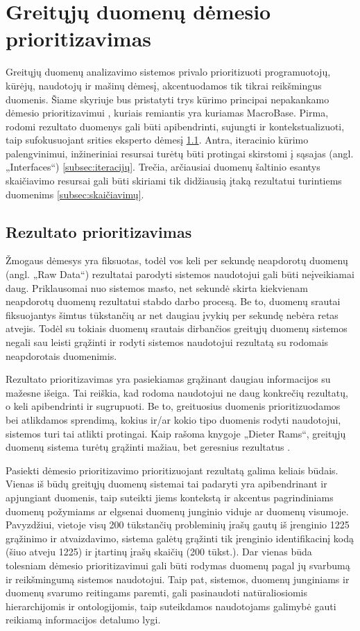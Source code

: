 \documentclass{VUMIFPSkursinis}
\begin{document}
\section{Greitųjų duomenų dėmesio prioritizavimas}
Greitųjų duomenų analizavimo sistemos privalo prioritizuoti programuotojų, kūrėjų, naudotojų ir mašinų dėmesį, akcentuodamos tik tikrai reikšmingus duomenis. Šiame skyriuje bus pristatyti trys kūrimo principai nepakankamo dėmesio prioritizavimui \cite{prioritizing_attention}, kuriais remiantis yra kuriamas MacroBase. Pirma, rodomi rezultato duomenys gali būti apibendrinti, sujungti ir kontekstualizuoti, taip sufokusuojant srities eksperto dėmesį \ref{subsec:rezultato}. Antra, iteracinio kūrimo palengvinimui, inžineriniai resursai turėtų būti protingai skirstomi į sąsajas (angl. „Interfaces“) \ref{subsec:iteracijų}. Trečia, arčiausiai duomenų šaltinio esantys skaičiavimo resursai gali būti skiriami tik didžiausią įtaką rezultatui turintiems duomenims \ref{subsec:skaičiavimų}.
 
\subsection{Rezultato prioritizavimas} \label{subsec:rezultato}
Žmogaus dėmesys yra fiksuotas, todėl vos keli per sekundę neapdorotų duomenų (angl. „Raw Data“) rezultatai parodyti sistemos naudotojui gali būti neįveikiamai daug. Priklausomai nuo sistemos masto, net sekundė skirta kiekvienam neapdorotų duomenų rezultatui stabdo darbo procesą. Be to, duomenų srautai fiksuojantys šimtus tūkstančių ar net daugiau įvykių per sekundę nebėra retas atvejis. Todėl su tokiais duomenų srautais dirbančios greitųjų duomenų sistemos negali sau leisti grąžinti ir rodyti sistemos naudotojui rezultatą su rodomais neapdorotais duomenimis.\par
Rezultato prioritizavimas yra pasiekiamas grąžinant daugiau informacijos su mažesne išeiga. Tai reiškia, kad rodoma naudotojui ne daug konkrečių rezultatų, o keli apibendrinti ir sugrupuoti. Be to, greituosius duomenis prioritizuodamos bei atlikdamos sprendimą, kokius ir/ar kokio tipo duomenis rodyti naudotojui, sistemos turi tai atlikti protingai. Kaip rašoma knygoje „Dieter Rams“, greitųjų duomenų sistema turėtų grąžinti mažiau, bet geresnius rezultatus  \cite{little_design}.\par
Pasiekti dėmesio prioritizavimo prioritizuojant rezultatą galima keliais būdais. Vienas iš būdų greitųjų duomenų sistemai tai padaryti yra apibendrinant ir apjungiant duomenis, taip suteikti jiems kontekstą ir akcentus pagrindiniams duomenų požymiams ar elgsenai duomenų junginio viduje ar duomenų visumoje. Pavyzdžiui, vietoje visų 200 tūkstančių probleminių įrašų gautų iš įrenginio 1225 grąžinimo ir atvaizdavimo, sistema galėtų grąžinti tik įrenginio identifikacinį kodą (šiuo atveju 1225) ir įtartinų įrašų skaičių (200 tūkst.). Dar vienas būda tolesniam dėmesio prioritizavimui gali būti rodymas duomenų pagal jų svarbumą ir reikšmingumą sistemos naudotojui. Taip pat, sistemos, duomenų junginiams ir duomenų svarumo reitingams paremti, gali pasinaudoti natūraliosiomis hierarchijomis ir ontologijomis, taip suteikdamos naudotojams galimybė gauti reikiamą informacijos detalumo lygi.
\end{document}
